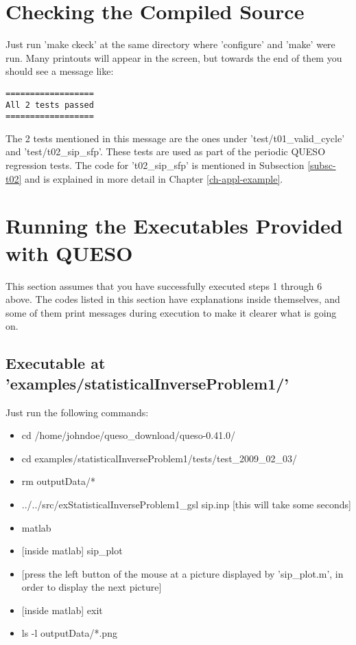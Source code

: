 \section{Checking the Compiled Source} \label{sc-checks}

Just run 'make ckeck' at the same directory where 'configure' and 'make' were run.
Many printouts will appear in the screen, but towards the end of them you should see
a message like:
\begin{verbatim}
==================
All 2 tests passed
==================
\end{verbatim}

The 2 tests mentioned in this message are the ones under 'test/t01\_valid\_cycle' and
'test/t02\_sip\_sfp'. These tests are used as part of the periodic QUESO regression tests.
The code for 't02\_sip\_sfp' is mentioned in Subsection \ref{subsc-t02} and is explained in more detail in Chapter \ref{ch-appl-example}.

\section{Running the Executables Provided with QUESO} \label{sc-running-execs}

This section assumes that you have successfully executed steps 1 through 6 above.
The codes listed in this section have explanations inside themselves, and some of them
print messages during execution to make it clearer what is going on.

\subsection{Executable at 'examples/statisticalInverseProblem1/'}

Just run the following commands:
\begin{itemize}
\item cd /home/johndoe/queso\_download/queso-0.41.0/
\item cd examples/statisticalInverseProblem1/tests/test\_2009\_02\_03/
\item rm outputData/*
\item ../../src/exStatisticalInverseProblem1\_gsl sip.inp [this will take some seconds]
\item matlab
\item {[inside matlab]} sip\_plot
\item {[press the left button of the mouse at a picture displayed by 'sip\_plot.m', in order to display the next picture]}
\item {[inside matlab]} exit
\item ls -l outputData/*.png
\end{itemize}

